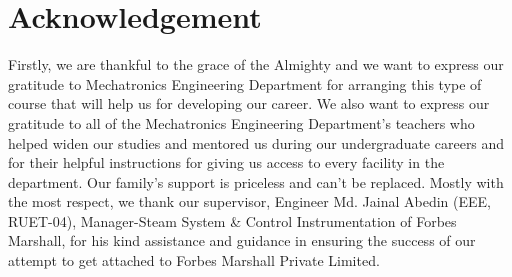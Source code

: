 \section*{Acknowledgement}
 
Firstly, we are thankful to the grace of the Almighty and we want to express our gratitude to Mechatronics Engineering Department for arranging this type of course that will help us for developing our career. We also want to express our gratitude to all of the Mechatronics Engineering Department’s teachers who helped widen our studies and mentored us during our undergraduate careers and for their helpful instructions for giving us access to every facility in the department. Our family’s support is priceless and can’t be replaced. 
Mostly with the most respect, we thank our supervisor, Engineer Md. Jainal Abedin (EEE, RUET-04), Manager-Steam System \& Control Instrumentation of Forbes Marshall, for his kind assistance and guidance in ensuring the success of our attempt to get attached to Forbes Marshall Private Limited. 

 
 
 
 
 
 
 
 
